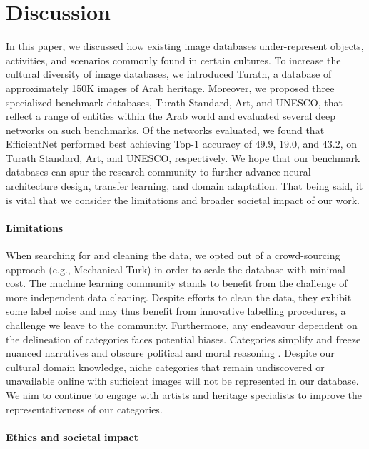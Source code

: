 \documentclass{article}
\begin{document}
\section{Discussion}
\label{section:discussion}

In this paper, we discussed how existing image databases under-represent objects, activities, and scenarios commonly found in certain cultures. To increase the cultural diversity of image databases, we introduced Turath, a database of approximately 150K images of Arab heritage. Moreover, we proposed three specialized benchmark databases, Turath Standard, Art, and UNESCO, that reflect a range of entities within the Arab world and evaluated several deep networks on such benchmarks. Of the networks evaluated, we found that EfficientNet performed best achieving Top-1 accuracy of $49.9$, $19.0$, and $43.2$, on Turath Standard, Art, and UNESCO, respectively. We hope that our benchmark databases can spur the research community to further advance neural architecture design, transfer learning, and domain adaptation. That being said, it is vital that we consider the limitations and broader societal impact of our work.

\paragraph{Limitations} 

When searching for and cleaning the data, we opted out of a crowd-sourcing approach (e.g., Mechanical Turk) in order to scale the database with minimal cost. The machine learning community stands to benefit from the challenge of more independent data cleaning. Despite efforts to clean the data, they exhibit some label noise and may thus benefit from innovative labelling procedures, a challenge we leave to the community. Furthermore, any endeavour dependent on the delineation of categories faces potential biases. Categories simplify and freeze nuanced narratives and obscure political and moral reasoning \cite{Birhane2021}. Despite our cultural domain knowledge, niche categories that remain undiscovered or unavailable online with sufficient images will not be represented in our database. We aim to continue to engage with artists and heritage specialists to improve the representativeness of our categories. 

\paragraph{Ethics and societal impact}
\end{document}
